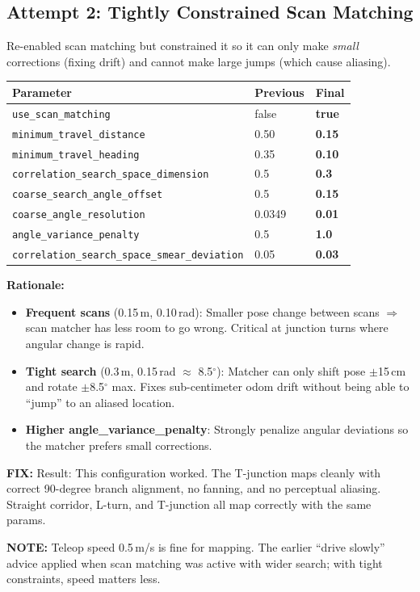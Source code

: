 \documentclass[11pt]{article}
\newcommand{\logentry}[1]{\subsection*{#1}}
\newcommand{\fix}[1]{\textcolor{fixgreen}{\textbf{FIX:} #1}}
\newcommand{\note}[1]{\textcolor{notblue}{\textbf{NOTE:} #1}}
\begin{document}
\logentry{Attempt 2: Tightly Constrained Scan Matching}
Re-enabled scan matching but constrained it so it can only make \emph{small}
corrections (fixing drift) and cannot make large jumps (which cause aliasing).
\begin{center}
\begin{tabular}{lll}
\textbf{Parameter} & \textbf{Previous} & \textbf{Final} \\
\hline
\texttt{use\_scan\_matching} & false & \textbf{true} \\
\texttt{minimum\_travel\_distance} & 0.50 & \textbf{0.15} \\
\texttt{minimum\_travel\_heading} & 0.35 & \textbf{0.10} \\
\texttt{correlation\_search\_space\_dimension} & 0.5 & \textbf{0.3} \\
\texttt{coarse\_search\_angle\_offset} & 0.5 & \textbf{0.15} \\
\texttt{coarse\_angle\_resolution} & 0.0349 & \textbf{0.01} \\
\texttt{angle\_variance\_penalty} & 0.5 & \textbf{1.0} \\
\texttt{correlation\_search\_space\_smear\_deviation} & 0.05 & \textbf{0.03} \\
\end{tabular}
\end{center}
\textbf{Rationale:}
\begin{itemize}
  \item \textbf{Frequent scans} (0.15\,m, 0.10\,rad): Smaller pose change between
    scans $\Rightarrow$ scan matcher has less room to go wrong. Critical at
    junction turns where angular change is rapid.
  \item \textbf{Tight search} (0.3\,m, 0.15\,rad $\approx$ 8.5$^\circ$): Matcher
    can only shift pose $\pm$15\,cm and rotate $\pm$8.5$^\circ$ max. Fixes
    sub-centimeter odom drift without being able to ``jump'' to an aliased
    location.
  \item \textbf{Higher angle\_variance\_penalty}: Strongly penalize angular
    deviations so the matcher prefers small corrections.
\end{itemize}

\fix{Result: This configuration worked. The T-junction maps cleanly with
correct 90-degree branch alignment, no fanning, and no perceptual aliasing.
Straight corridor, L-turn, and T-junction all map correctly with the same
params.}

\note{Teleop speed 0.5\,m/s is fine for mapping. The earlier ``drive slowly''
advice applied when scan matching was active with wider search; with tight
constraints, speed matters less.}
\end{document}

